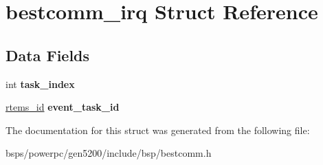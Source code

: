 \hypertarget{structbestcomm__irq}{}\section{bestcomm\+\_\+irq Struct Reference}
\label{structbestcomm__irq}
\subsection*{Data Fields}
\begin{DoxyCompactItemize}
\item 
\mbox{\label{structbestcomm__irq_a92903df29aa756fec7ed00199b8b58d4}} 
int {\bfseries task\+\_\+index}
\item 
\mbox{\label{structbestcomm__irq_abf3888083ce1c58a5c32d6872b25f210}} 
\mbox{\hyperlink{group__ClassicTasks_gab20892b814dced7dd4e5b9bf42becd57}{rtems\+\_\+id}} {\bfseries event\+\_\+task\+\_\+id}
\end{DoxyCompactItemize}


The documentation for this struct was generated from the following file\+:\begin{DoxyCompactItemize}
\item 
bsps/powerpc/gen5200/include/bsp/bestcomm.\+h\end{DoxyCompactItemize}
